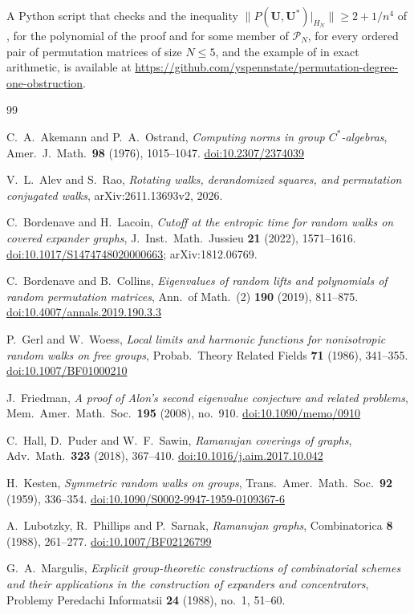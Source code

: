 \documentclass[11pt]{article}
\theoremstyle{remark}
\providecommand{\doi}[1]{\href{https://doi.org/#1}{doi:#1}}
\begin{document}
A Python script that checks  and the inequality
$\|P(\mathbf U,\mathbf U^*)|_{H_N}\|\ge 2+1/n^4$ of , for the polynomial of the proof and for some
member of $\mathcal P_N$, for every ordered pair of permutation matrices of size $N\le 5$, and the example of
 in exact arithmetic, is available at
\url{https://github.com/yspennstate/permutation-degree-one-obstruction}.

\begin{thebibliography}{99}

C.~A.~Akemann and P.~A.~Ostrand,
\emph{Computing norms in group $C^*$-algebras},
Amer.\ J.\ Math.\ \textbf{98} (1976), 1015--1047.
\doi{10.2307/2374039}

V.~L.~Alev and S.~Rao,
\emph{Rotating walks, derandomized squares, and permutation conjugated walks},
arXiv:2611.13693v2, 2026.

C.~Bordenave and H.~Lacoin,
\emph{Cutoff at the entropic time for random walks on covered expander graphs},
J.\ Inst.\ Math.\ Jussieu \textbf{21} (2022), 1571--1616.
\doi{10.1017/S1474748020000663}; arXiv:1812.06769.

C.~Bordenave and B.~Collins,
\emph{Eigenvalues of random lifts and polynomials of random permutation matrices},
Ann.\ of Math.\ (2) \textbf{190} (2019), 811--875.
\doi{10.4007/annals.2019.190.3.3}

P.~Gerl and W.~Woess,
\emph{Local limits and harmonic functions for nonisotropic random walks on free groups},
Probab.\ Theory Related Fields \textbf{71} (1986), 341--355.
\doi{10.1007/BF01000210}

J.~Friedman,
\emph{A proof of Alon's second eigenvalue conjecture and related problems},
Mem.\ Amer.\ Math.\ Soc.\ \textbf{195} (2008), no.~910.
\doi{10.1090/memo/0910}

C.~Hall, D.~Puder and W.~F.~Sawin,
\emph{Ramanujan coverings of graphs},
Adv.\ Math.\ \textbf{323} (2018), 367--410.
\doi{10.1016/j.aim.2017.10.042}

H.~Kesten,
\emph{Symmetric random walks on groups},
Trans.\ Amer.\ Math.\ Soc.\ \textbf{92} (1959), 336--354.
\doi{10.1090/S0002-9947-1959-0109367-6}

A.~Lubotzky, R.~Phillips and P.~Sarnak,
\emph{Ramanujan graphs},
Combinatorica \textbf{8} (1988), 261--277.
\doi{10.1007/BF02126799}

G.~A.~Margulis,
\emph{Explicit group-theoretic constructions of combinatorial schemes and their applications in the construction of
expanders and concentrators},
Problemy Peredachi Informatsii \textbf{24} (1988), no.~1, 51--60.


\end{thebibliography}
\end{document}
